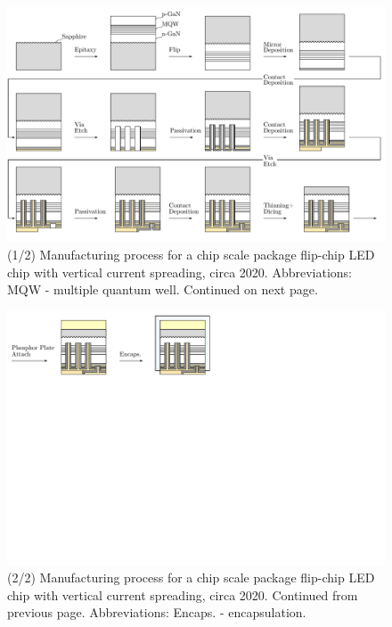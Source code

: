 \documentclass[10pt]{article}
\begin{document}

    \begin{landscape}
        \begin{figure}
            \includegraphics[width=595pt]{./figures/csp_overview_2020-1.pdf}
            \caption{(1/2) Manufacturing process for a chip scale package flip-chip LED chip with vertical current spreading, circa 2020. Abbreviations: MQW - multiple quantum well. Continued on next page.}
            \label{fig:manuf_csp_2020-1}
        \end{figure}
    \end{landscape}

    \begin{landscape}
        \begin{figure}
            \includegraphics[width=595pt]{./figures/csp_overview_2020-2.pdf}
            \caption{(2/2) Manufacturing process for a chip scale package flip-chip LED chip with vertical current spreading, circa 2020. Continued from previous page. Abbreviations: Encaps. - encapsulation.}
            \label{fig:manuf_csp_2020-2}
        \end{figure}
    \end{landscape}
\end{document}
